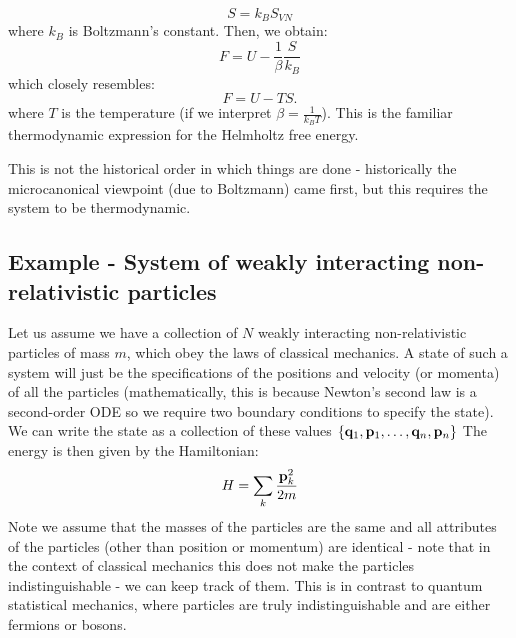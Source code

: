 \begin{equation}
    S = k_B S_{VN}
\end{equation}
where $k_B$ is Boltzmann's constant. Then, we obtain:
\begin{equation}
    F = U - \frac{1}{\beta}\frac{S}{k_B}
\end{equation}
which closely resembles:
\begin{equation}
    F = U - TS. 
\end{equation}
where $T$ is the temperature (if we interpret $\beta = \frac{1}{k_B T}$). This is the familiar thermodynamic expression for the Helmholtz free energy.

This is not the historical order in which things are done - historically the microcanonical viewpoint (due to Boltzmann) came first, but this requires the system to be thermodynamic.

\subsection{Example - System of weakly interacting non-relativistic particles}
Let us assume we have a collection of $N$ weakly interacting non-relativistic particles of mass $m$, which obey the laws of classical mechanics. A state of such a system will just be the specifications of the positions and velocity (or momenta) of all the particles (mathematically, this is because Newton's second law is a second-order ODE so we require two boundary conditions to specify the state). We can write the state as a collection of these values $\set{\ensuremath{\mathbf{q}}_1, \ensuremath{\mathbf{p}}_1, \ldots, \ensuremath{\mathbf{q}}_n, \ensuremath{\mathbf{p}}_n}$ The energy is then given by the Hamiltonian:
\begin{equation}
    H = \sum_k \frac{\mathbf{p}_k^2}{2m}
\end{equation}
Note we assume that the masses of the particles are the same and all attributes of the particles (other than position or momentum) are identical - note that in the context of classical mechanics this does not make the particles indistinguishable - we can keep track of them. This is in contrast to quantum statistical mechanics, where particles are truly indistinguishable and are either fermions or bosons.

